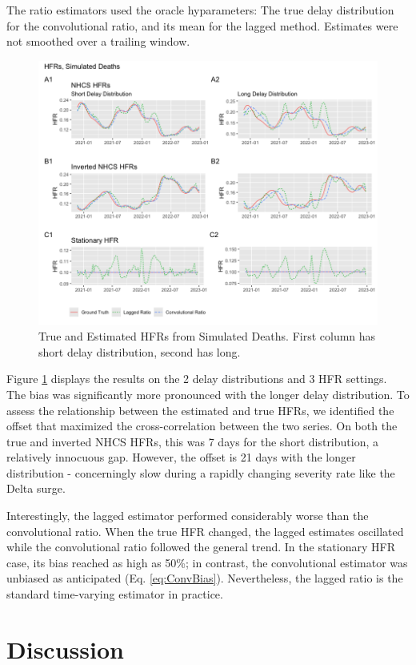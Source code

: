 \documentclass{article}
\begin{document}
The ratio estimators used the oracle hyparameters: The true delay distribution for the convolutional ratio, and its mean for the lagged method. Estimates were not smoothed over a trailing window.

\begin{figure}
    \centering
    \includegraphics[width=0.9\linewidth]{Figs/simulated_results2.png}
    \caption{True and Estimated HFRs from Simulated Deaths. First column has short delay distribution, second has long.}
    \label{fig:sims}
\end{figure}

Figure \ref{fig:sims} displays the results on the 2 delay distributions and 3 HFR settings. The bias was significantly more pronounced with the longer delay distribution. To assess the relationship between the estimated and true HFRs, we identified the offset that maximized the cross-correlation between the two series. On both the true and inverted NHCS HFRs, this was 7 days for the short distribution, a relatively innocuous gap. However, the offset is 21 days with the longer distribution - concerningly slow during a rapidly changing severity rate like the Delta surge.

Interestingly, the lagged estimator performed considerably worse than the convolutional ratio. When the true HFR changed, the lagged estimates oscillated while the convolutional ratio followed the general trend. In the stationary HFR case, its bias reached as high as 50\%; in contrast, the convolutional estimator was unbiased as anticipated (Eq. \ref{eq:ConvBias}). Nevertheless, the lagged ratio is the standard time-varying estimator in practice. 

\section{Discussion}
\end{document}
